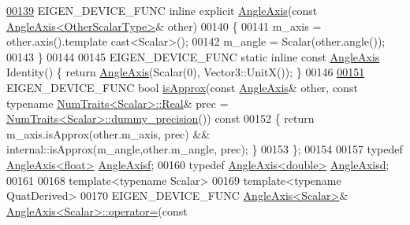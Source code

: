 \begin{DoxyCode}
\hyperlink{group___geometry___module_a5cc9091af03beb618eb16ee5f910f067}{00139}   EIGEN\_DEVICE\_FUNC \textcolor{keyword}{inline} \textcolor{keyword}{explicit} \hyperlink{group___geometry___module_a5cc9091af03beb618eb16ee5f910f067}{AngleAxis}(\textcolor{keyword}{const} 
      \hyperlink{group___geometry___module_class_eigen_1_1_angle_axis}{AngleAxis<OtherScalarType>}& other)
00140   \{
00141     m\_axis = other.axis().template cast<Scalar>();
00142     m\_angle = Scalar(other.angle());
00143   \}
00144 
00145   EIGEN\_DEVICE\_FUNC \textcolor{keyword}{static} \textcolor{keyword}{inline} \textcolor{keyword}{const} \hyperlink{group___geometry___module_class_eigen_1_1_angle_axis}{AngleAxis} Identity() \{ \textcolor{keywordflow}{return} 
      \hyperlink{group___geometry___module_class_eigen_1_1_angle_axis}{AngleAxis}(Scalar(0), Vector3::UnitX()); \}
00146 
\hyperlink{group___geometry___module_a3f219c579dbdce81add9299b8d3938ae}{00151}   EIGEN\_DEVICE\_FUNC \textcolor{keywordtype}{bool} \hyperlink{group___geometry___module_a3f219c579dbdce81add9299b8d3938ae}{isApprox}(\textcolor{keyword}{const} \hyperlink{group___geometry___module_class_eigen_1_1_angle_axis}{AngleAxis}& other, \textcolor{keyword}{const} \textcolor{keyword}{typename} 
      \hyperlink{group___core___module_struct_eigen_1_1_num_traits}{NumTraits<Scalar>::Real}& prec = 
      \hyperlink{group___core___module_struct_eigen_1_1_num_traits}{NumTraits<Scalar>::dummy\_precision}())\textcolor{keyword}{ const}
00152 \textcolor{keyword}{  }\{ \textcolor{keywordflow}{return} m\_axis.isApprox(other.m\_axis, prec) && internal::isApprox(m\_angle,other.m\_angle, prec); \}
00153 \};
00154 
00157 \textcolor{keyword}{typedef} \hyperlink{group___geometry___module_class_eigen_1_1_angle_axis}{AngleAxis<float>} \hyperlink{group___geometry___module_gadc7128416da41ca99bb8af814b78599e}{AngleAxisf};
00160 \textcolor{keyword}{typedef} \hyperlink{group___geometry___module_class_eigen_1_1_angle_axis}{AngleAxis<double>} \hyperlink{group___geometry___module_gac218cd8f23b49aa36401d0c843bb6835}{AngleAxisd};
00161 
00168 \textcolor{keyword}{template}<\textcolor{keyword}{typename} Scalar>
00169 \textcolor{keyword}{template}<\textcolor{keyword}{typename} QuatDerived>
00170 EIGEN\_DEVICE\_FUNC \hyperlink{group___geometry___module_class_eigen_1_1_angle_axis}{AngleAxis<Scalar>}& 
      \hyperlink{group___geometry___module_class_eigen_1_1_angle_axis}{AngleAxis<Scalar>::operator=}(\textcolor{keyword}{const} 

\end{DoxyCode}

